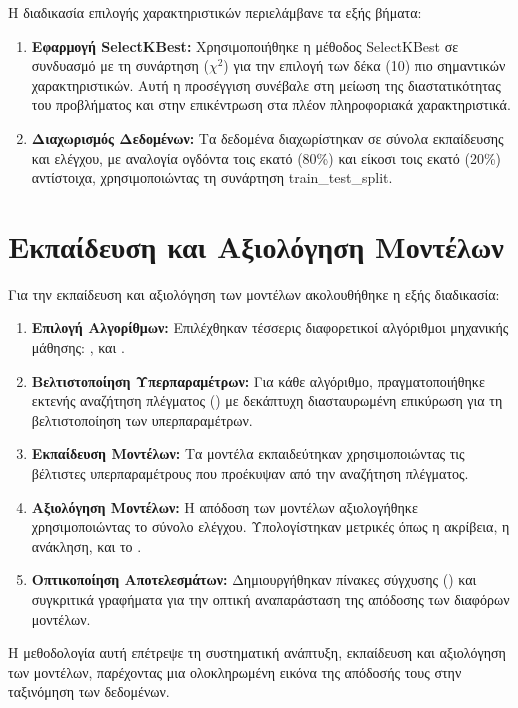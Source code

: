 Η διαδικασία επιλογής χαρακτηριστικών περιελάμβανε τα εξής βήματα:
\begin{enumerate}
\item
  \textbf{Εφαρμογή \textlatin{SelectKBest}:} Χρησιμοποιήθηκε η μέθοδος
  \textlatin{SelectKBest} σε συνδυασμό με τη συνάρτηση (${\chi}^2$) για
  την επιλογή των δέκα (10) πιο σημαντικών χαρακτηριστικών. Αυτή η
  προσέγγιση συνέβαλε στη μείωση της διαστατικότητας του προβλήματος και
  στην επικέντρωση στα πλέον πληροφοριακά χαρακτηριστικά.

\item
  \textbf{Διαχωρισμός Δεδομένων:} Τα δεδομένα διαχωρίστηκαν σε σύνολα
  εκπαίδευσης και ελέγχου, με αναλογία ογδόντα τοις εκατό (80\%) και
  είκοσι τοις εκατό (20\%) αντίστοιχα, χρησιμοποιώντας τη συνάρτηση
  \textlatin{train\_test\_split}.
\end{enumerate}

\section{Εκπαίδευση και Αξιολόγηση Μοντέλων}

Για την εκπαίδευση και αξιολόγηση των μοντέλων ακολουθήθηκε η εξής
διαδικασία:
\begin{enumerate}
\item
  \textbf{Επιλογή Αλγορίθμων:} Επιλέχθηκαν τέσσερις διαφορετικοί
  αλγόριθμοι μηχανικής μάθησης: , και .
\item
  \textbf{Βελτιστοποίηση Υπερπαραμέτρων:} Για κάθε αλγόριθμο,
  πραγματοποιήθηκε εκτενής αναζήτηση πλέγματος () με
  δεκάπτυχη διασταυρωμένη επικύρωση για τη βελτιστοποίηση των
  υπερπαραμέτρων.

\item
  \textbf{Εκπαίδευση Μοντέλων:} Τα μοντέλα εκπαιδεύτηκαν χρησιμοποιώντας
  τις βέλτιστες υπερπαραμέτρους που προέκυψαν από την αναζήτηση
  πλέγματος.

\item
  \textbf{Αξιολόγηση Μοντέλων:} Η απόδοση των μοντέλων αξιολογήθηκε
  χρησιμοποιώντας το σύνολο ελέγχου. Υπολογίστηκαν μετρικές όπως η
  ακρίβεια, η ανάκληση, και το .

\item
  \textbf{Οπτικοποίηση Αποτελεσμάτων:} Δημιουργήθηκαν πίνακες σύγχυσης
  () και συγκριτικά γραφήματα για την οπτική
  αναπαράσταση της απόδοσης των διαφόρων μοντέλων.
\end{enumerate}
Η μεθοδολογία αυτή επέτρεψε τη συστηματική ανάπτυξη, εκπαίδευση και
αξιολόγηση των μοντέλων, παρέχοντας μια ολοκληρωμένη εικόνα της απόδοσής
τους στην ταξινόμηση των δεδομένων.
